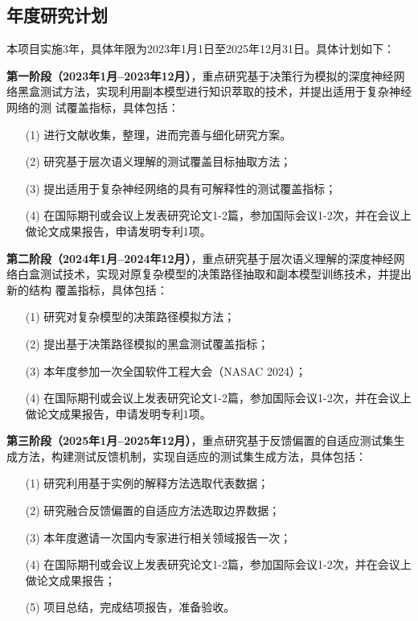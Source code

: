\subsection{年度研究计划}
本项目实施3年，具体年限为2023年1月1日至2025年12月31日。具体计划如下：

\textbf{第一阶段（2023年1月--2023年12月）}，重点研究基于决策行为模拟的深度神经网
络黑盒测试方法，实现利用副本模型进行知识萃取的技术，并提出适用于复杂神经网络的测
试覆盖指标，具体包括：
\begin{itemize}[itemindent=2em]
    \item[(1)] 进行文献收集，整理，进而完善与细化研究方案。
    \item[(2)] 研究基于层次语义理解的测试覆盖目标抽取方法；
    \item[(3)] 提出适用于复杂神经网络的具有可解释性的测试覆盖指标；
    \item[(4)] 在国际期刊或会议上发表研究论文1-2篇，参加国际会议1-2次，并在会议上
          做论文成果报告，申请发明专利1项。
\end{itemize}

\textbf{第二阶段（2024年1月--2024年12月）}，重点研究基于层次语义理解的深度神经网
络白盒测试技术，实现对原复杂模型的决策路径抽取和副本模型训练技术，并提出新的结构
覆盖指标，具体包括：
\begin{itemize}[itemindent=2em]
    \item[(1)] 研究对复杂模型的决策路径模拟方法；
    \item[(2)] 提出基于决策路径模拟的黑盒测试覆盖指标；
    \item[(3)] 本年度参加一次全国软件工程大会（NASAC 2024）；
    \item[(4)] 在国际期刊或会议上发表研究论文1-2篇，参加国际会议1-2次，并在会议上做论文成果报告，申请发明专利1项。
\end{itemize}

\textbf{第三阶段（2025年1月--2025年12月）}，重点研究基于反馈偏置的自适应测试集生
成方法，构建测试反馈机制，实现自适应的测试集生成方法，具体包括：
\begin{itemize}[itemindent=2em]
    \item[(1)] 研究利用基于实例的解释方法选取代表数据；
    \item[(2)] 研究融合反馈偏置的自适应方法选取边界数据；
    \item[(3)] 本年度邀请一次国内专家进行相关领域报告一次；
    \item[(4)] 在国际期刊或会议上发表研究论文1-2篇，参加国际会议1-2次，并在会议上
          做论文成果报告；
    \item[(5)] 项目总结，完成结项报告，准备验收。
\end{itemize}

